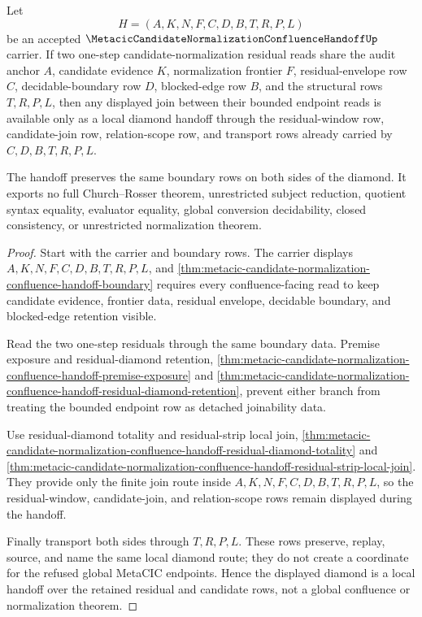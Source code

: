 \begin{theorem}
\label{thm:metacic-normalization-confluence-local-diamond}
Let
$$
H=(A,K,N,F,C,D,B,T,R,P,L)
$$
be an accepted $\MetacicCandidateNormalizationConfluenceHandoffUp$ carrier. If two one-step candidate-normalization residual reads share the audit anchor $A$, candidate evidence $K$, normalization frontier $F$, residual-envelope row $C$, decidable-boundary row $D$, blocked-edge row $B$, and the structural rows $T,R,P,L$, then any displayed join between their bounded endpoint reads is available only as a local diamond handoff through the residual-window row, candidate-join row, relation-scope row, and transport rows already carried by $C,D,B,T,R,P,L$.

The handoff preserves the same boundary rows on both sides of the diamond. It exports no full Church--Rosser theorem, unrestricted subject reduction, quotient syntax equality, evaluator equality, global conversion decidability, closed consistency, or unrestricted normalization theorem.
\end{theorem}
\begin{proof}
Start with the carrier and boundary rows. The carrier displays $A,K,N,F,C,D,B,T,R,P,L$, and \autoref{thm:metacic-candidate-normalization-confluence-handoff-boundary} requires every confluence-facing read to keep candidate evidence, frontier data, residual envelope, decidable boundary, and blocked-edge retention visible.

Read the two one-step residuals through the same boundary data. Premise exposure and residual-diamond retention, \autoref{thm:metacic-candidate-normalization-confluence-handoff-premise-exposure} and \autoref{thm:metacic-candidate-normalization-confluence-handoff-residual-diamond-retention}, prevent either branch from treating the bounded endpoint row as detached joinability data.

Use residual-diamond totality and residual-strip local join, \autoref{thm:metacic-candidate-normalization-confluence-handoff-residual-diamond-totality} and \autoref{thm:metacic-candidate-normalization-confluence-handoff-residual-strip-local-join}. They provide only the finite join route inside $A,K,N,F,C,D,B,T,R,P,L$, so the residual-window, candidate-join, and relation-scope rows remain displayed during the handoff.

Finally transport both sides through $T,R,P,L$. These rows preserve, replay, source, and name the same local diamond route; they do not create a coordinate for the refused global MetaCIC endpoints. Hence the displayed diamond is a local handoff over the retained residual and candidate rows, not a global confluence or normalization theorem.
\end{proof}

